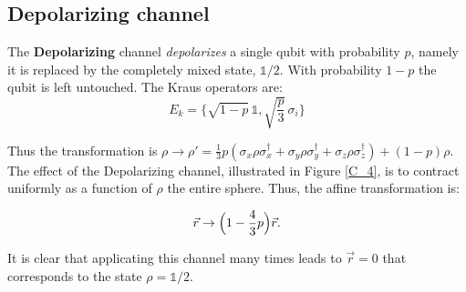 \subsection{Depolarizing channel} 
\label{Dep_section}

The \textbf{Depolarizing} channel \textit{depolarizes} a single qubit with probability $p$, namely it is replaced by the completely mixed state, $\mathbb{1}/2$. With probability $1-p$ the qubit is left untouched.  The Kraus operators are: 
\begin{equation}
 E_k = \biggl\{ \sqrt{1-p}\, \mathbb{1},  \sqrt{\frac{p}{3}}\, \sigma_i \biggr\} 
\label{26_firstchapter}
 \end{equation}

\noindent Thus the transformation is $\rho \rightarrow \rho' = \frac{1}{3}p(\sigma_x \rho \sigma_x^\dagger + \sigma_y \rho \sigma_y^\dagger + \sigma_z \rho \sigma_z^\dagger ) + (1-p)\rho$. 
The effect of the Depolarizing channel, illustrated in Figure \ref{C_4}, is to contract uniformly as a function of $\rho$ the entire sphere. Thus, the affine transformation is:

\begin{equation}
\vec{r} \rightarrow \Bigl( 1 - \frac{4}{3}p \Bigr) \vec{r}.
\label{27_firstchapter}
 \end{equation}

\noindent It is clear that applicating this channel many times leads to $\vec{r}=0$ that corresponds to the state $\rho= \mathbb{1}/2$.





